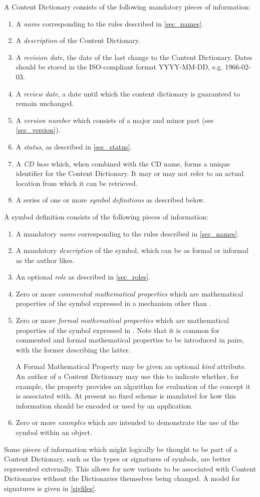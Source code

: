 A Content Dictionary consists of the following mandatory pieces of information:
\begin{enumerate}
\item A \emph{name} corresponding to the rules described in \ref{sec_names}.
\item A \emph{description} of the Content Dictionary.
\item A \emph{revision date}, the date of the last change to the Content Dictionary.
  Dates should be stored in the ISO-compliant format YYYY-MM-DD, e.g. 1966-02-03.
\item A \emph{review date}, a date until which the content dictionary is guaranteed to
  remain unchanged.
\item A \emph{version number} which consists of a major and minor part (see
  \ref{sec_version}).
\item A \emph{status}, as described in \ref{sec_status}.
\item A \emph{CD base} which, when combined with the CD name, forms a unique identifier
  for the Content Dictionary. It may or may not refer to an actual location from which it
  can be retrieved.
\item A series of one or more \emph{symbol definitions} as described below.
\end{enumerate}
A symbol definition consists of the following pieces of information:
\begin{enumerate}
\item A mandatory \emph{name} corresponding to the rules described in \ref{sec_names}.
\item A mandatory \emph{description} of the symbol, which can be as formal or informal as
  the author likes.
\item An optional \emph{role} as described in \ref{sec_roles}.
\item Zero or more \emph{commented mathematical properties} which are
  mathematical properties of the symbol expressed in a mechanism other than \OM.
\item Zero or more \emph{formal mathematical properties} which are
  mathematical properties of the symbol expressed in \OM.  Note that it is common for
  commented and formal mathematical properties to be introduced in pairs, with the former
  describing the latter.
	  
  A Formal Mathematical Property may be given an optional \emph{kind} attribute.  An
  author of a Content Dictionary may use this to indicate whether, for example, the
  property provides an algorithm for evaluation of the concept it is associated with.  At
  present no fixed scheme is mandated for how this information should be encoded or used
  by an application.
\item Zero or more \emph{examples} which are intended to demonstrate the use of the symbol
  within an \OM object.
\end{enumerate}
Some pieces of information which might logically be thought to be part of a Content
Dictionary, such as the types or signatures of symbols, are better represented externally.
This allows for new variants to be associated with Content Dictionaries without the
Dictionaries themselves being changed.  A model for signatures is given in \ref{sigfiles}.
    
